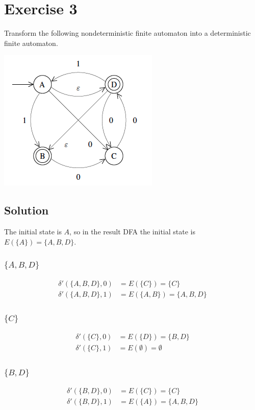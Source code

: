 \documentclass[10pt]{article}
\begin{document}
\section*{Exercise 3}
\color{blue} Transform the following nondeterministic finite automaton into a deterministic finite automaton.
\begin{center}
\includegraphics[scale=0.7]{Exercise3NFA}
\end{center}
\color{black}
\subsection*{Solution}
The initial state is $A$, so in the result DFA the initial state is $E(\{ A \}) = \{ A, B, D \}$.
\subsubsection*{$\{A, B, D\}$}
\begin{align*}
\delta'( \{ A, B, D \}, 0 ) &= E( \{ C \} ) = \{ C \} \\
\delta'( \{ A, B, D \}, 1 ) &= E( \{ A, B \}) = \{ A, B, D \}
\end{align*}
\subsubsection*{$\{ C \}$}
\begin{align*}
\delta'( \{ C \}, 0 ) &= E( \{ D \} ) = \{ B, D \} \\
\delta'( \{ C \}, 1 ) &= E( \emptyset ) = \emptyset
\end{align*}
\subsubsection*{$\{ B, D \}$}
\begin{align*}
\delta'( \{ B, D \}, 0 ) &= E( \{ C \} ) = \{ C \} \\
\delta'( \{ B, D \}, 1 ) &= E( \{ A \} ) = \{ A, B, D \}
\end{align*}
\end{document}
